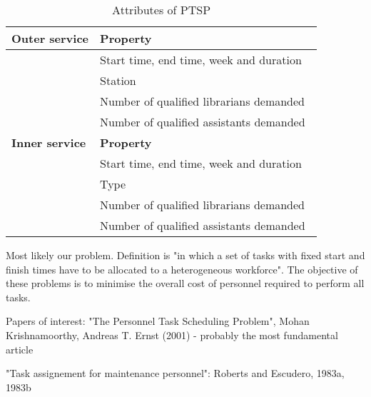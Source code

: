 \begin{table}[!h]
\caption{Attributes of PTSP}
\label{PTSP}
\begin{tabular}{|l|l|}
\hline
\textbf{Outer service} & \textbf{Property} \\ \hline
 & Start time, end time, week and duration \
\\ \hline 
 & Station
\\ \hline 
 & Number of qualified librarians demanded
\\ \hline 
 & Number of qualified assistants demanded
\\ \hline 

\textbf{Inner service} & \textbf{Property} \\ \hline
 & Start time, end time, week and duration \
\\ \hline 
 & Type
\\ \hline 
 & Number of qualified librarians demanded
\\ \hline 
 & Number of qualified assistants demanded
\\ \hline 
\end{tabular}
\end{table}

Most likely our problem. Definition is "in which a set of tasks with fixed start and finish times have to be allocated to a heterogeneous workforce". The objective of these problems is to minimise the overall cost of personnel required to perform all tasks.

Papers of interest:
"The Personnel Task Scheduling Problem", Mohan Krishnamoorthy, Andreas T. Ernst (2001) - probably the most fundamental article

"Task assignement for maintenance personnel": Roberts and Escudero, 1983a, 1983b


